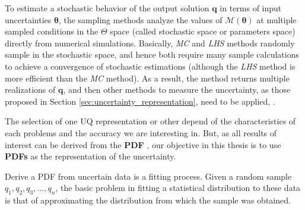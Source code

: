 To estimate a stochastic behavior of the output solution $\bm{q}$  in terms of input uncertainties $\bm{\theta}$, the sampling methods analyze the values of $\mathcal{M}(\bm{\theta})$ at multiple sampled conditions in the $\Theta$ space (called stochastic space or parameters space) directly from numerical simulations. Basically, \textit{MC} and \textit{LHS} methods randomly sample in the stochastic space, and hence both require many sample calculations to achieve a convergence of stochastic estimations (although the \textit{LHS} method is more efficient than the \textit{MC} method). As a result, the method returns multiple realizations of $\bm{q}$, and then other methods to measure the uncertainty, as those proposed in Section \ref{sec:uncertainty_representation}, need to be applied,  \cite{Baxter2016, Estacio-Hiroms2012, Farrell2015}. 

The selection of one UQ representation or other depend of the characteristics of each problems and the accuracy we are interesting in. But, as all results of interest can be derived from the \textbf{PDF} \cite{Cox2012}, our objective in this thesis is to use \textbf{PDFs} as the representation of the uncertainty. 
 

%

Derive a PDF from uncertain data is a fitting process. Given a random sample $q_{1}, q_{2}, q_{3},...,q_{n}$, the basic problem in fitting a statistical distribution to these data is that of approximating the distribution from which the sample was obtained. 

